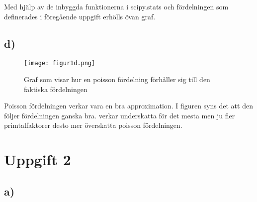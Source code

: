 \documentclass[a4paper]{article}
\begin{document}
Med hjälp av de inbyggda funktionerna i scipy.stats och fördelningen som definerades i föregående uppgift erhölls övan graf.

\subsection{d)}

\begin{figure}[H]
    \begin{small}
        \begin{center}
            \texttt{[image: figur1d.png]}
        \end{center}
        \caption{Graf som visar hur en poisson fördelning förhåller sig till den faktiska fördelningen}
        \label{fig:1d}
    \end{small}
\end{figure}

Poisson fördelningen verkar vara en bra approximation. I figuren syns det att den följer fördelningen ganska bra. verkar underskatta för det mesta men ju fler primtalfaktorer desto mer överskatta poisson fördelningen. 

\section{Uppgift 2}

\subsection{a)}

\begin{table}[H]
    \caption{Statistiska grund data för alla upptäckta planeter fram till och med 2021}
    \label{tab:1}
\end{table}
\end{document}
